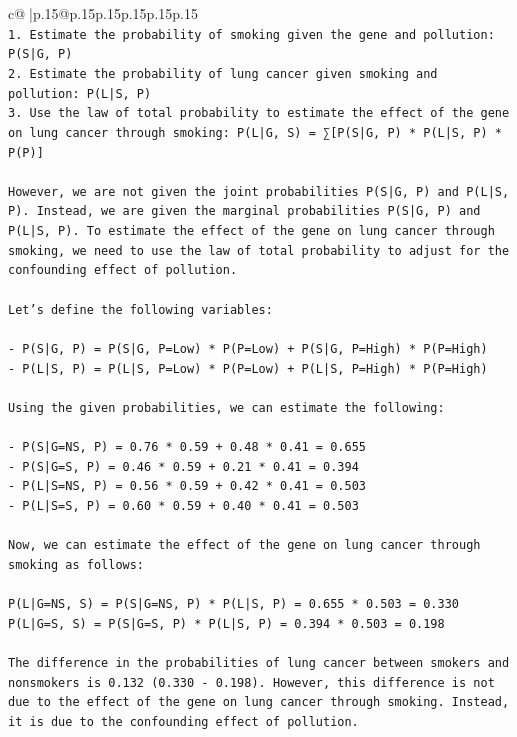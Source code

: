 \documentclass{article}
\begin{document}
{\begin{supertabular}{c@{$\;$}|p{.15\linewidth}@{}p{.15\linewidth}p{.15\linewidth}p{.15\linewidth}p{.15\linewidth}p{.15\linewidth}}
{{{\\ 
\texttt{1. Estimate the probability of smoking given the gene and pollution: P(S|G, P)} \\
\texttt{2. Estimate the probability of lung cancer given smoking and pollution: P(L|S, P)} \\
\texttt{3. Use the law of total probability to estimate the effect of the gene on lung cancer through smoking: P(L|G, S) = ∑{[}P(S|G, P) * P(L|S, P) * P(P){]}} \\
\\ 
\texttt{However, we are not given the joint probabilities P(S|G, P) and P(L|S, P). Instead, we are given the marginal probabilities P(S|G, P) and P(L|S, P). To estimate the effect of the gene on lung cancer through smoking, we need to use the law of total probability to adjust for the confounding effect of pollution.} \\
\\ 
\texttt{Let's define the following variables:} \\
\\ 
\texttt{{-} P(S|G, P) = P(S|G, P=Low) * P(P=Low) + P(S|G, P=High) * P(P=High)} \\
\texttt{{-} P(L|S, P) = P(L|S, P=Low) * P(P=Low) + P(L|S, P=High) * P(P=High)} \\
\\ 
\texttt{Using the given probabilities, we can estimate the following:} \\
\\ 
\texttt{{-} P(S|G=NS, P) = 0.76 * 0.59 + 0.48 * 0.41 = 0.655} \\
\texttt{{-} P(S|G=S, P) = 0.46 * 0.59 + 0.21 * 0.41 = 0.394} \\
\texttt{{-} P(L|S=NS, P) = 0.56 * 0.59 + 0.42 * 0.41 = 0.503} \\
\texttt{{-} P(L|S=S, P) = 0.60 * 0.59 + 0.40 * 0.41 = 0.503} \\
\\ 
\texttt{Now, we can estimate the effect of the gene on lung cancer through smoking as follows:} \\
\\ 
\texttt{P(L|G=NS, S) = P(S|G=NS, P) * P(L|S, P) = 0.655 * 0.503 = 0.330} \\
\texttt{P(L|G=S, S) = P(S|G=S, P) * P(L|S, P) = 0.394 * 0.503 = 0.198} \\
\\ 
\texttt{The difference in the probabilities of lung cancer between smokers and nonsmokers is 0.132 (0.330 {-} 0.198). However, this difference is not due to the effect of the gene on lung cancer through smoking. Instead, it is due to the confounding effect of pollution.} \\
}}}
\end{supertabular}}
\end{document}

